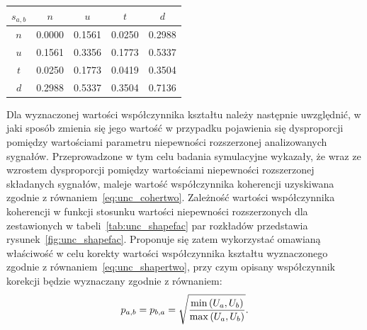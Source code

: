 \begin{table}[htb!]
\begin{center}
\begin{tabular}[c]{| c | S[table-format = 1.4] | S[table-format = 1.4] | S[table-format = 1.4] | S[table-format = 1.4] |} \hline
$s_{a,b}$ & \textbf{$n$} & \textbf{$u$} & \textbf{$t$} & \textbf{$d$} \\ \hline
$n$       & 0.0000       & 0.1561       & 0.0250       & 0.2988       \\ \hline
$u$       & 0.1561       & 0.3356       & 0.1773       & 0.5337       \\ \hline
$t$       & 0.0250       & 0.1773       & 0.0419       & 0.3504       \\ \hline
$d$       & 0.2988       & 0.5337       & 0.3504       & 0.7136       \\ \hline
\end{tabular}
\end{center}
\end{table}

Dla wyznaczonej wartości współczynnika kształtu należy następnie uwzględnić, w jaki sposób zmienia się jego wartość w przypadku pojawienia się dysproporcji pomiędzy wartościami parametru niepewności rozszerzonej analizowanych sygnałów. Przeprowadzone w tym celu badania symulacyjne wykazały, że wraz ze wzrostem dysproporcji pomiędzy wartościami niepewności rozszerzonej składanych sygnałów, maleje wartość współczynnika koherencji uzyskiwana zgodnie z równaniem~\eqref{eq:unc_cohertwo}. Zależność wartości współczynnika koherencji w funkcji stosunku wartości niepewności rozszerzonych dla zestawionych w tabeli~\ref{tab:unc_shapefac} par rozkładów przedstawia rysunek~\ref{fig:unc_shapefac}. Proponuje się zatem wykorzystać omawianą właściwość w celu korekty wartości współczynnika kształtu wyznaczonego zgodnie z równaniem~\eqref{eq:unc_shapertwo}, przy czym opisany współczynnik korekcji będzie wyznaczany zgodnie z równaniem:
\begin{equation}
p_{a,b} = p_{b,a} = \sqrt{\frac{\min \left(U_{a}, U_{b}\right)}{\max \left(U_{a}, U_{b}\right)}} \label{eq:unc_cohercorra}.
\end{equation}

